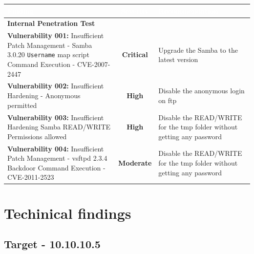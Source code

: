 \documentclass[a4paper]{article} %
\begin{document}
    \begin{table}[htbp]
        \centering
        \begin{tabularx}{\textwidth}{|X|c|X|}
            \hline
            \rowcolor{blueColor}
            \textbf{\textcolor{white}{Finding}} &
            \textbf{\textcolor{white}{Severity}} &
            \textbf{\textcolor{white}{Recommendation}} \\
            \hline
            \multicolumn{3}{|l|}{\cellcolor{lightBlueColor}\textbf{Internal Penetration Test}} \\
            \hline
            \textbf{Vulnerability 001:} Insufficient Patch Management - Samba 3.0.20
            \texttt{Username} map script Command Execution - CVE-2007-2447 & 
            \cellcolor{criticalColor}\textbf{Critical} &
            Upgrade the Samba to the latest version \\
            \hline
            \textbf{Vulnerability 002:} Insufficient Hardening - Anonymous permitted & 
            \cellcolor{highColor}\textbf{High} &
            Disable the anonymous login on ftp \\
            \hline
            \textbf{Vulnerability 003:} Insufficient Hardening Samba READ/WRITE Permissions allowed & 
            \cellcolor{highColor}\textbf{High} &
            Disable the READ/WRITE for the tmp folder without getting any password \\
            \hline
            \textbf{Vulnerability 004:} Insufficient Patch Management - vsftpd 2.3.4 Backdoor Command Execution - CVE-2011-2523 & 
            \cellcolor{moderateColor}\textbf{Moderate} &
            Disable the READ/WRITE for the tmp folder without getting any password \\
            \hline
        \end{tabularx}
    \end{table}

    \clearpage

    \section{Techinical findings}
    \subsection{Target - 10.10.10.5}
\end{document}
